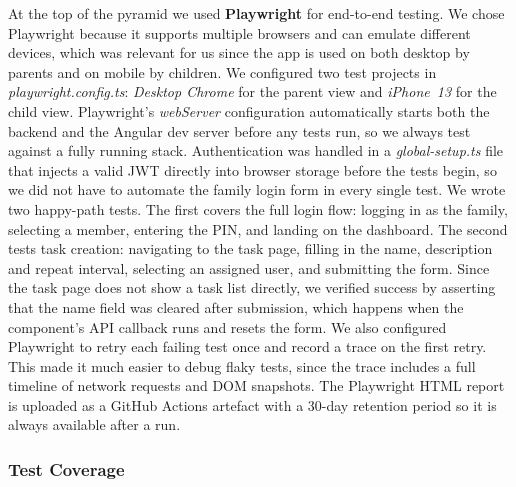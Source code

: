 At the top of the pyramid we used \textbf{Playwright} for end-to-end testing. We chose Playwright because it supports multiple browsers and can emulate different devices, which was relevant for us since the app is used on both desktop by parents and on mobile by children. We configured two test projects in \textit{playwright.config.ts}: \textit{Desktop Chrome} for the parent view and \textit{iPhone~13} for the child view.
\newline
\newline
\noindent
Playwright's \textit{webServer} configuration automatically starts both the backend and the Angular dev server before any tests run, so we always test against a fully running stack. Authentication was handled in a \textit{global-setup.ts} file that injects a valid JWT directly into browser storage before the tests begin, so we did not have to automate the family login form in every single test.
\newline
\newline
\noindent
We wrote two happy-path tests. The first covers the full login flow: logging in as the family, selecting a member, entering the PIN, and landing on the dashboard. The second tests task creation: navigating to the task page, filling in the name, description and repeat interval, selecting an assigned user, and submitting the form. Since the task page does not show a task list directly, we verified success by asserting that the name field was cleared after submission, which happens when the component's API callback runs and resets the form.
\newline
\newline
\noindent
We also configured Playwright to retry each failing test once and record a trace on the first retry. This made it much easier to debug flaky tests, since the trace includes a full timeline of network requests and DOM snapshots. The Playwright HTML report is uploaded as a GitHub Actions artefact with a 30-day retention period so it is always available after a run.

\subsubsection{Test Coverage}

